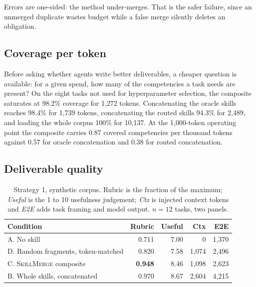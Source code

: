 \documentclass[11pt]{article}
\newcommand{\sm}{\textsc{SkillMerge}}
\begin{document}
Errors are one-sided: the method under-merges. That is the safer failure, since an unmerged
duplicate wastes budget while a false merge silently deletes an obligation.

\subsection{Coverage per token}

Before asking whether agents write better deliverables, a cheaper question is available: for a given
spend, how many of the competencies a task needs are present? On the eight tasks not used for
hyperparameter selection, the composite saturates at 98.2\% coverage for 1,272 tokens. Concatenating
the oracle skills reaches 98.4\% for 1,739 tokens, concatenating the routed skills 94.3\% for 2,489,
and loading the whole corpus 100\% for 10,137. At the 1,000-token operating point the composite
carries 0.87 covered competencies per thousand tokens against 0.57 for oracle concatenation and 0.38
for routed concatenation.

\subsection{Deliverable quality}

\begin{table}[t]\centering\small
\begin{tabular}{lrrrr}
\toprule
Condition & Rubric & Useful & Ctx & E2E \\
\midrule
A. No skill & 0.711 & 7.00 & 0 & 1{,}370 \\
D. Random fragments, token-matched & 0.820 & 7.58 & 1{,}074 & 2{,}496 \\
C. \sm{} composite & \textbf{0.948} & 8.46 & 1{,}098 & 2{,}623 \\
B. Whole skills, concatenated & 0.970 & 8.67 & 2{,}604 & 4{,}215 \\
\bottomrule
\end{tabular}
\caption{Strategy 1, synthetic corpus. Rubric is the fraction of the maximum; \emph{Useful} is the
1 to 10 usefulness judgement; \emph{Ctx} is injected context tokens and \emph{E2E} adds task
framing and model output. $n = 12$ tasks, two panels.}
\label{tab:s1main}
\end{table}
\end{document}
